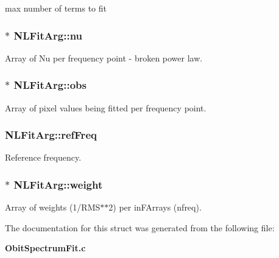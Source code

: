 max number of terms to fit 

\subsubsection{$\ast$ {\bf NLFit\-Arg::nu}}\label{structNLFitArg_o8}


Array of Nu per frequency point - broken power law. 

\subsubsection{$\ast$ {\bf NLFit\-Arg::obs}}\label{structNLFitArg_o12}


Array of pixel values being fitted per frequency point. 

\subsubsection{ {\bf NLFit\-Arg::ref\-Freq}}\label{structNLFitArg_o16}


Reference frequency. 

\subsubsection{$\ast$ {\bf NLFit\-Arg::weight}}\label{structNLFitArg_o10}


Array of weights (1/RMS$\ast$$\ast$2) per in\-FArrays (nfreq). 



The documentation for this struct was generated from the following file:\begin{CompactItemize}
\item 
{\bf Obit\-Spectrum\-Fit.c}\end{CompactItemize}

